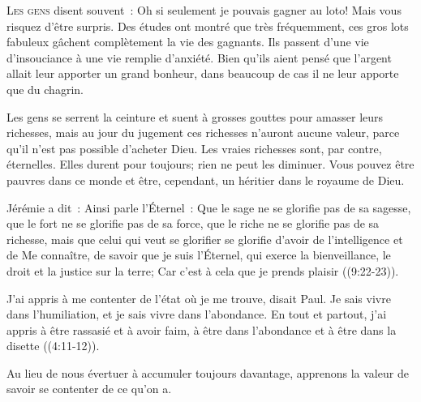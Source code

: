 \lettrine{L}{es gens} disent souvent~: 
 \og Oh si seulement je pouvais gagner au loto! \fg{}
 Mais vous risquez d'être surpris. Des études ont montré
 que très fréquemment, ces gros lots fabuleux gâchent complètement
 la vie des gagnants. Ils passent d'une vie d'insouciance
 à une vie remplie d'anxiété. Bien qu'ils aient pensé
 que l'argent allait leur apporter un grand bonheur,
 dans beaucoup de cas il ne leur apporte que du chagrin.

Les gens se serrent la ceinture et suent à grosses gouttes
 pour amasser leurs richesses, mais au jour du jugement
 ces richesses n'auront aucune valeur, parce qu'il n'est pas possible
 d'acheter Dieu. Les vraies richesses sont, par contre, éternelles.
 Elles durent pour toujours; rien ne peut les diminuer.
 Vous pouvez être pauvres dans ce monde et être, cependant,
 un héritier dans le royaume de Dieu.


Jérémie a dit~: 
 \og Ainsi parle l'Éternel~: Que le sage ne se glorifie pas de sa sagesse,
 que le fort ne se glorifie pas de sa force, que le riche ne se glorifie pas
 de sa richesse, mais que celui qui veut se glorifier se glorifie d'avoir
 de l'intelligence et de Me connaître, de savoir que je suis l'Éternel,
 qui exerce la bienveillance, le droit et la justice sur la terre;
 Car c'est à cela que je prends plaisir \fg{} 
 ((9:22-23)).

\og J'ai appris à me contenter de l'état où je me trouve, disait Paul.
 Je sais vivre dans l'humiliation, et je sais vivre dans l'abondance.
 En tout et partout, j'ai appris à être rassasié et à avoir faim,
 à être dans l'abondance et à être dans la disette \fg{} 
 ((4:11-12)).

Au lieu de nous évertuer à accumuler toujours davantage, apprenons la valeur
 de savoir se contenter de ce qu'on a. 

\dvrule






